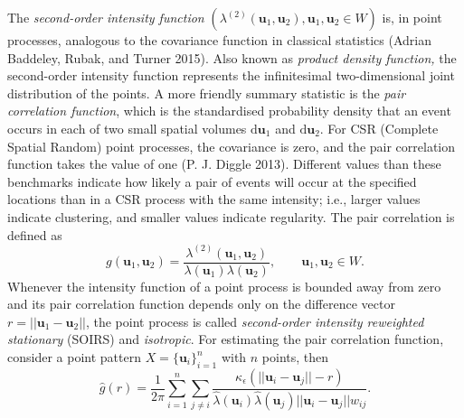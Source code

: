 The \emph{second-order intensity function} \((\lambda^{(2)}(\mathbf{u}_1,\mathbf{u}_2), \mathbf{u}_1,\mathbf{u}_2\in W)\) is, in point processes, analogous to the covariance function in classical statistics (Adrian Baddeley, Rubak, and Turner 2015). Also known as \emph{product density function,} the second-order intensity function represents the infinitesimal two-dimensional joint distribution of the points. A more friendly summary statistic is the \emph{pair correlation function}, which is the standardised probability density that an event occurs in each of two small spatial volumes \(\text{d} \mathbf{u}_1\) and \(\text{d} \mathbf{u}_2\). For CSR (Complete Spatial Random) point processes, the covariance is zero, and the pair correlation function takes the value of one (P. J. Diggle 2013). Different values than these benchmarks indicate how likely a pair of events will occur at the specified locations than in a CSR process with the same intensity; i.e., larger values indicate clustering, and smaller values indicate regularity. The pair correlation is defined as
\begin{equation}
    g(\mathbf{u}_1,\mathbf{u}_2)=\frac{\lambda^{(2)}(\mathbf{u}_1,\mathbf{u}_2)}{\lambda(\mathbf{u}_1)\lambda(\mathbf{u}_2)}, \qquad \mathbf{u}_1,\mathbf{u}_2\in W.
    \label{eq:spatialpcf}
\end{equation}
Whenever the intensity function of a point process is bounded away from zero and its pair correlation function depends only on the difference vector \(r =||\mathbf{u}_1 - \mathbf{u}_2||\), the point process is called \emph{second-order intensity reweighted stationary} (SOIRS) and \emph{isotropic}. For estimating the pair correlation function, consider a point pattern \(X=\{\mathbf{u}_{i}\}_{i=1}^n\) with \(n\) points, then
\begin{equation}
    \hat{g}(r)=\frac{1}{2\pi} \sum_{i=1}^n \sum_{j\neq i}
    \frac{\kappa_{\epsilon}(||\mathbf{u}_{i}-\mathbf{u}_{j}||- r)}{\hat{\lambda} ( \mathbf{u}_{i}) \hat{\lambda} (\mathbf{u}_{j}) ||\mathbf{u}_{i}-\mathbf{u}_{j}|| w_{ij}}.
    \label{eq:gestimada1}
\end{equation}
